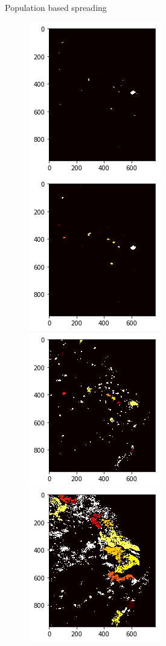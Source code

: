 \documentclass{beamer}
\begin{document}
\begin{frame}{Population based spreading}
  \begin{figure}
    \includegraphics[width = 0.4\linewidth]{pics/ntl/jzh/jzh4.png}
    \includegraphics[width = 0.4\linewidth]{pics/ntl/jzh/jzh3.png}
    \includegraphics[width = 0.4\linewidth]{pics/ntl/jzh/jzh2.png}
    \includegraphics[width = 0.4\linewidth]{pics/ntl/jzh/jzh1.png}
  \end{figure}
\end{frame}
\end{document}
